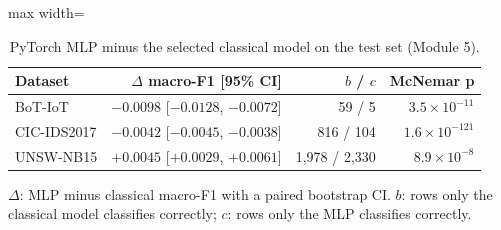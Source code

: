 \begin{table}[t]
\centering
\caption{PyTorch MLP minus the selected classical model on the test set (Module 5).}
\label{tab:mlp_vs_classical}
\footnotesize
\setlength{\tabcolsep}{3.5pt}
\begin{adjustbox}{max width=\linewidth}
\begin{tabular}{lrrr}
\toprule
Dataset & $\Delta$ macro-F1 [95\% CI] & $b$ / $c$ & McNemar p \\
\midrule
BoT-IoT & $-0.0098$ [$-0.0128$, $-0.0072$] & 59 / 5 & $3.5\times10^{-11}$ \\
CIC-IDS2017 & $-0.0042$ [$-0.0045$, $-0.0038$] & 816 / 104 & $1.6\times10^{-121}$ \\
UNSW-NB15 & $+0.0045$ [$+0.0029$, $+0.0061$] & 1,978 / 2,330 & $8.9\times10^{-8}$ \\
\bottomrule
\end{tabular}
\end{adjustbox}
\par\vspace{2pt}
\parbox{0.98\linewidth}{\scriptsize $\Delta$: MLP minus classical macro-F1 with a paired bootstrap CI. $b$: rows only the classical model classifies correctly; $c$: rows only the MLP classifies correctly.}
\end{table}
